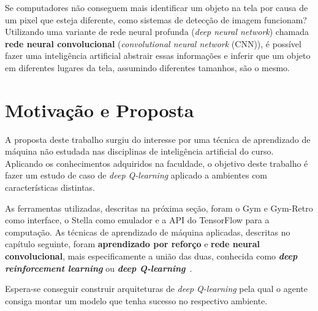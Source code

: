 Se computadores não conseguem mais identificar um objeto na tela por causa de um pixel que esteja diferente, como sistemas de detecção de imagem funcionam?
Utilizando uma variante de rede neural profunda (\textit{deep neural network}) chamada \textbf{rede neural convolucional} (\textit{convolutional neural network} (CNN)), é possível fazer uma inteligência artificial abstrair essas informações e inferir que um objeto em diferentes lugares da tela, assumindo diferentes tamanhos, são o mesmo.

\section{Motivação e Proposta}
\label{sec:motivacao_proposta}

A proposta deste trabalho surgiu do interesse por uma técnica de aprendizado de máquina não estudada nas disciplinas de inteligência artificial do curso.
Aplicando os conhecimentos adquiridos na faculdade, o objetivo deste trabalho é fazer um estudo de caso de \textit{deep Q-learning} aplicado a ambientes com características distintas.

As ferramentas utilizadas, descritas na próxima seção, foram o Gym e Gym-Retro como interface, o Stella como emulador e a API do TensorFlow para a computação.
As técnicas de aprendizado de máquina aplicadas, descritas no capítulo seguinte, foram \textbf{aprendizado por reforço} e \textbf{rede neural convolucional}, mais especificamente a união das duas, conhecida como \textit{\textbf{deep reinforcement learning}} ou \textit{\textbf{deep Q-learning}}~\cite{DBLP:journals/corr/MnihKSGAWR13}.

Espera-se conseguir construir arquiteturas de \textit{deep Q-learning} pela qual o agente consiga montar um modelo que tenha sucesso no respectivo ambiente.

